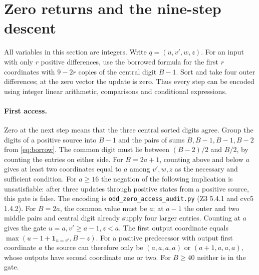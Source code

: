 \documentclass[11pt,reqno]{amsart}
\newcommand{\file}[1]{\nolinkurl{#1}}
\begin{document}
\section{Zero returns and the nine-step descent}\label{app:clock}
All variables in this section are integers. Write $q=(u,v',w,z)$.
For an input with only $r$ positive differences, use the borrowed
formula for the first $r$ coordinates with $9-2r$ copies of the
central digit $B-1$. Sort and take four outer differences; at the zero
vector the update is zero. Thus every step can be encoded using integer
linear arithmetic, comparisons and conditional expressions.

\paragraph{First access.}
Zero at the next step means that the three central sorted digits agree.
Group the digits of a positive source into $B-1$ and the pairs of sums
$B,B-1,B-1,B-2$ from \eqref{eq:borrow}. The common digit must lie
between $(B-2)/2$ and $B/2$, by counting the entries on either side.
For $B=2a+1$, counting above and below $a$ gives at least two coordinates
equal to $a$ among $v',w,z$ as the necessary and sufficient condition.
For $a\ge16$ the negation of the following implication is unsatisfiable:
after three updates through positive states from a positive source, this
gate is false. The encoding is \file{odd_zero_access_audit.py}
(Z3 5.4.1 and cvc5 1.4.2).
For $B=2a$, the common value must be $a$; at $a-1$ the outer and two
middle pairs and central digit already supply four larger entries.
Counting at $a$ gives the gate $u=a, v'\ge a-1,z<a$.
The first output coordinate equals $\max(u-1+\boldsymbol1_{u=v'},B-z)$.
For a positive predecessor with output first coordinate $a$ the source
can therefore only be $(a,a,a,a)$ or $(a+1,a,a,a)$, whose outputs
have second coordinate one or two. For $B\ge40$ neither is in the gate.
\end{document}
